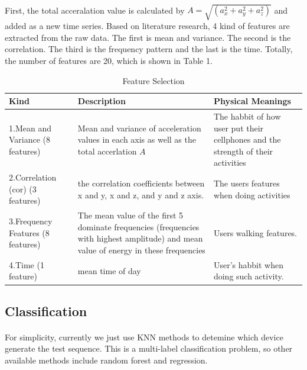 \documentclass{article}
\begin{document}
		\paragraph{}First, the total acceralation value is calculated by $A=\sqrt{(a_x^2+a_y^2+a_z^2)}$ and added as a new time series. Based on literature research, 4 kind of features are extracted from the raw data. The first is mean and variance. The second is the correlation. The third is the frequency pattern and the last is the time. Totally, the number of features are 20, which is shown in Table 1. 
		\begin{table}
			\centering
			\caption{Feature Selection}
			\begin{tabular}{p{3cm}|p{6cm}|p{4cm}}
			Kind & Description & Physical Meanings \\ \hline
			1.Mean and Variance (8 features) & Mean and variance of acceleration values in each axis as well as the total accerlation $A$ & The habbit of how user put their cellphones and the strength of their activities \\ \hline
			2.Correlation (cor) (3 features) & the correlation coefficients between x and y, x and z, and y and z axis. & The users features when doing activities \\ \hline
			3.Frequency Features (8 features) & The mean value of the first 5 dominate frequencies (frequencies with highest amplitude) and mean value of energy in these frequencies & Users walking features.\\ \hline
			4.Time (1 feature) & mean time of day & User's habbit when doing such activity.
			\end{tabular}
		\end{table}

	
		\subsection{Classification} %
		\label{sub:classifier}
		\paragraph{} For simplicity, currently we just use KNN methods to detemine which device generate the test sequence. This is a multi-label classification problem, so other available methods include random forest and regression. 
		
\end{document}
